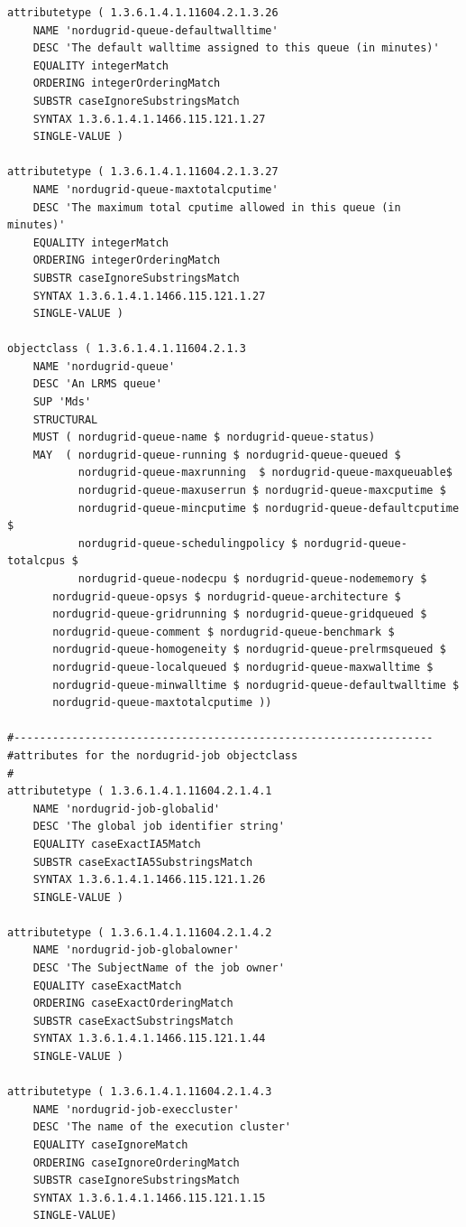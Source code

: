 \documentclass{article}
\begin{document}
\begin{verbatim}
attributetype ( 1.3.6.1.4.1.11604.2.1.3.26
    NAME 'nordugrid-queue-defaultwalltime'
    DESC 'The default walltime assigned to this queue (in minutes)'
    EQUALITY integerMatch
    ORDERING integerOrderingMatch
    SUBSTR caseIgnoreSubstringsMatch
    SYNTAX 1.3.6.1.4.1.1466.115.121.1.27
    SINGLE-VALUE )     

attributetype ( 1.3.6.1.4.1.11604.2.1.3.27
    NAME 'nordugrid-queue-maxtotalcputime'
    DESC 'The maximum total cputime allowed in this queue (in minutes)'
    EQUALITY integerMatch
    ORDERING integerOrderingMatch
    SUBSTR caseIgnoreSubstringsMatch
    SYNTAX 1.3.6.1.4.1.1466.115.121.1.27
    SINGLE-VALUE )

objectclass ( 1.3.6.1.4.1.11604.2.1.3
    NAME 'nordugrid-queue'
    DESC 'An LRMS queue'
    SUP 'Mds'
    STRUCTURAL
    MUST ( nordugrid-queue-name $ nordugrid-queue-status)    
    MAY  ( nordugrid-queue-running $ nordugrid-queue-queued $
    	   nordugrid-queue-maxrunning  $ nordugrid-queue-maxqueuable$
    	   nordugrid-queue-maxuserrun $ nordugrid-queue-maxcputime $
    	   nordugrid-queue-mincputime $ nordugrid-queue-defaultcputime $
    	   nordugrid-queue-schedulingpolicy $ nordugrid-queue-totalcpus $
    	   nordugrid-queue-nodecpu $ nordugrid-queue-nodememory $
	   nordugrid-queue-opsys $ nordugrid-queue-architecture $	   
	   nordugrid-queue-gridrunning $ nordugrid-queue-gridqueued $
	   nordugrid-queue-comment $ nordugrid-queue-benchmark $
	   nordugrid-queue-homogeneity $ nordugrid-queue-prelrmsqueued $
	   nordugrid-queue-localqueued $ nordugrid-queue-maxwalltime $
	   nordugrid-queue-minwalltime $ nordugrid-queue-defaultwalltime $
	   nordugrid-queue-maxtotalcputime ))

#-----------------------------------------------------------------
#attributes for the nordugrid-job objectclass
#
attributetype ( 1.3.6.1.4.1.11604.2.1.4.1
    NAME 'nordugrid-job-globalid'
    DESC 'The global job identifier string'
    EQUALITY caseExactIA5Match
    SUBSTR caseExactIA5SubstringsMatch
    SYNTAX 1.3.6.1.4.1.1466.115.121.1.26    
    SINGLE-VALUE )

attributetype ( 1.3.6.1.4.1.11604.2.1.4.2
    NAME 'nordugrid-job-globalowner'
    DESC 'The SubjectName of the job owner'
    EQUALITY caseExactMatch
    ORDERING caseExactOrderingMatch
    SUBSTR caseExactSubstringsMatch
    SYNTAX 1.3.6.1.4.1.1466.115.121.1.44  
    SINGLE-VALUE )

attributetype ( 1.3.6.1.4.1.11604.2.1.4.3
    NAME 'nordugrid-job-execcluster'
    DESC 'The name of the execution cluster'
    EQUALITY caseIgnoreMatch
    ORDERING caseIgnoreOrderingMatch
    SUBSTR caseIgnoreSubstringsMatch
    SYNTAX 1.3.6.1.4.1.1466.115.121.1.15
    SINGLE-VALUE)


\end{verbatim}
\end{document}
